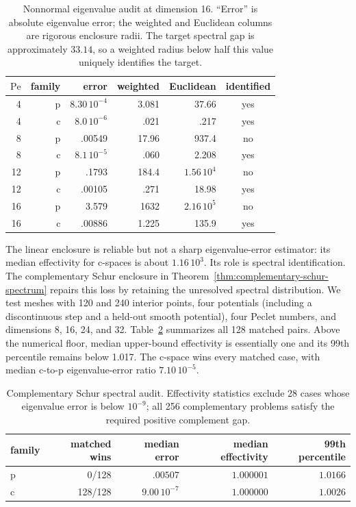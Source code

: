 \documentclass[11pt]{article}
\numberwithin{algorithm}{section}
\theoremstyle{definition}\newtheorem{definition}[theorem]{Definition}
\theoremstyle{remark}\newtheorem{remark}[theorem]{Remark}
\begin{document}
\begin{table}[t]
\centering
\caption{Nonnormal eigenvalue audit at dimension 16.  ``Error'' is absolute
eigenvalue error; the weighted and Euclidean columns are rigorous enclosure
radii.  The target spectral gap is approximately $33.14$, so a weighted radius
below half this value uniquely identifies the target.}
\label{tab:nonnormal-spectrum}
\begin{tabular}{rrr r r c}
\toprule
$\mathrm{Pe}$ & family & error & weighted & Euclidean & identified\\
\midrule
4  & p & $8.30\,10^{-4}$ & 3.081 & 37.66 & yes\\
4  & c & $8.0\,10^{-6}$  & .021 & .217 & yes\\
8  & p & .00549 & 17.96 & 937.4 & no\\
8  & c & $8.1\,10^{-5}$ & .060 & 2.208 & yes\\
12 & p & .1793 & 184.4 & $1.56\,10^4$ & no\\
12 & c & .00105 & .271 & 18.98 & yes\\
16 & p & 3.579 & 1632 & $2.16\,10^5$ & no\\
16 & c & .00886 & 1.225 & 135.9 & yes\\
\bottomrule
\end{tabular}
\end{table}

The linear enclosure is reliable but not a sharp eigenvalue-error estimator:
its median effectivity for c-spaces is about $1.16\,10^3$.  Its role is
spectral identification.  The complementary Schur enclosure in
Theorem~\ref{thm:complementary-schur-spectrum} repairs this loss by retaining
the unresolved spectral distribution.  We test meshes with 120 and 240
interior points, four potentials (including a discontinuous step and a held-out
smooth potential), four Peclet numbers, and dimensions 8, 16, 24, and 32.
Table~\ref{tab:schur-spectrum} summarizes all 128 matched pairs.  Above the
numerical floor, median upper-bound effectivity is essentially one and its
99th percentile remains below 1.017.  The c-space wins every matched case,
with median c-to-p eigenvalue-error ratio $7.10\,10^{-5}$.

\begin{table}[t]
\centering
\caption{Complementary Schur spectral audit.  Effectivity statistics exclude
28 cases whose eigenvalue error is below $10^{-9}$; all 256 complementary
problems satisfy the required positive complement gap.}
\label{tab:schur-spectrum}
\begin{tabular}{lrrrr}
\toprule
family & matched wins & median error & median effectivity & 99th percentile\\
\midrule
p & 0/128   & $.00507$ & $1.000001$ & $1.0166$\\
c & 128/128 & $9.00\,10^{-7}$ & $1.000000$ & $1.0026$\\
\bottomrule
\end{tabular}
\end{table}
\end{document}
